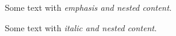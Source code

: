 \documentclass{article}
\begin{document}
	Some text with \emph{emphasis and \emph{nested} content}.
	
	Some text with \textit{italic and \textit{nested} content}.
\end{document}
